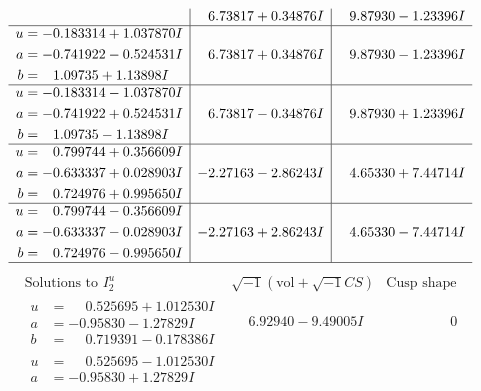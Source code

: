\documentclass[1p]{elsarticle_modified}
\theoremstyle{definition}
\newcommand{\I}{\sqrt{-1}}
\begin{document}
$$\begin{array}{c|c|c}
 & \phantom{-}6.73817 + 0.34876 I & \phantom{-}9.87930 - 1.23396 I \\ \hline\begin{aligned}
u &= -0.183314 + 1.037870 I \\
a &= -0.741922 - 0.524531 I \\
b &= \phantom{-}1.09735 + 1.13898 I\end{aligned}
 & \phantom{-}6.73817 + 0.34876 I & \phantom{-}9.87930 - 1.23396 I \\ \hline\begin{aligned}
u &= -0.183314 - 1.037870 I \\
a &= -0.741922 + 0.524531 I \\
b &= \phantom{-}1.09735 - 1.13898 I\end{aligned}
 & \phantom{-}6.73817 - 0.34876 I & \phantom{-}9.87930 + 1.23396 I \\ \hline\begin{aligned}
u &= \phantom{-}0.799744 + 0.356609 I \\
a &= -0.633337 + 0.028903 I \\
b &= \phantom{-}0.724976 + 0.995650 I\end{aligned}
 & -2.27163 - 2.86243 I & \phantom{-}4.65330 + 7.44714 I \\ \hline\begin{aligned}
u &= \phantom{-}0.799744 - 0.356609 I \\
a &= -0.633337 - 0.028903 I \\
b &= \phantom{-}0.724976 - 0.995650 I\end{aligned}
 & -2.27163 + 2.86243 I & \phantom{-}4.65330 - 7.44714 I\\
 \hline 
 \end{array}$$\newpage$$\begin{array}{c|c|c}  
\text{Solutions to }I^u_{2}& \I (\text{vol} + \sqrt{-1}CS) & \text{Cusp shape}\\
 \hline 
\begin{aligned}
u &= \phantom{-}0.525695 + 1.012530 I \\
a &= -0.95830 - 1.27829 I \\
b &= \phantom{-}0.719391 - 0.178386 I\end{aligned}
 & \phantom{-}6.92940 - 9.49005 I & \phantom{-0.000000 } 0 \\ \hline\begin{aligned}
u &= \phantom{-}0.525695 - 1.012530 I \\
a &= -0.95830 + 1.27829 I \\

\end{aligned}
\end{array}$$
\end{document}

